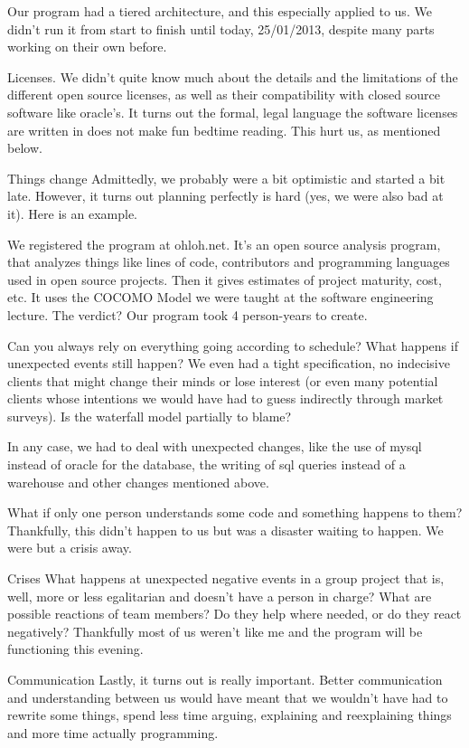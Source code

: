     Our program had a tiered architecture, and this especially applied to us. We didn't run it from start to finish until today, 25/01/2013, despite many parts working on their own before.

Licenses.
    We didn't quite know much about the details and the limitations of the different open source licenses, as well as their compatibility with closed source software like oracle's.
     It turns out the formal, legal language the software licenses are written in does not make fun bedtime reading.
     This hurt us, as mentioned below.

Things change
    Admittedly, we probably were a bit optimistic and started a bit late. However, it turns out planning perfectly is hard (yes, we were also bad at it). Here is an example.
    
    We registered the program at ohloh.net. It's an open source analysis program, that analyzes things like lines of code, contributors and programming languages used in open source projects.
    Then it gives estimates of project maturity, cost, etc.
    It uses the COCOMO Model we were taught at the software engineering lecture.
    The verdict? Our program took 4 person-years to create.
    
    Can you always rely on everything going according to schedule? What happens if unexpected events still happen? We even had a tight specification,
    no indecisive clients that might change their minds or lose interest (or even many potential clients whose intentions we would have had to guess indirectly through market surveys).
    Is the waterfall model partially to blame?
    
    In any case, we had to deal with unexpected changes, like the use of mysql instead of oracle for the database, the writing of sql queries instead of a warehouse and other changes mentioned above.
    

What if only one person understands some code and something happens to them?
    Thankfully, this didn't happen to us but was a disaster waiting to happen. We were but a crisis away.
    
Crises
    What happens at unexpected negative events in a group project that is, well, more or less egalitarian and doesn't have a person in charge? What are possible reactions of team members?
    Do they help where needed, or do they react negatively?
    Thankfully most of us weren't like me and the program will be functioning this evening.

Communication
    Lastly, it turns out is really important. Better communication and understanding between us would have meant that we wouldn't have had to rewrite some things, spend less time arguing, explaining and reexplaining things and more time
    actually programming.
